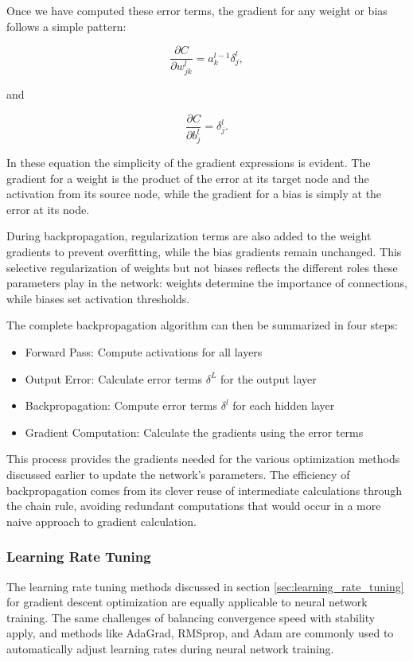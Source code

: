 Once we have computed these error terms, the gradient for any weight or bias follows a simple pattern:

\begin{equation}
    \frac{\partial C}{\partial w_{jk}^l} = a_k^{l-1}\delta_j^l,
\end{equation}

and

\begin{equation}
    \frac{\partial C}{\partial b_j^l} = \delta_j^l.
\end{equation}

In these equation the simplicity of the gradient expressions is evident. The gradient for a weight is the product of the error at its target node and the activation from its source node, while the gradient for a bias is simply at the error at its node.

During backpropagation, regularization terms are also added to the weight gradients to prevent overfitting, while the bias gradients remain unchanged. This selective regularization of weights but not biases reflects the different roles these parameters play in the network: weights determine the importance of connections, while biases set activation thresholds.

The complete backpropagation algorithm can then be summarized in four steps:

\begin{itemize}
    \item Forward Pass: Compute activations for all layers
    \item Output Error: Calculate error terms \( \delta^L \) for the output layer
    \item Backpropagation: Compute error terms \( \delta^l \) for each hidden layer
    \item Gradient Computation: Calculate the gradients using the error terms
\end{itemize}

This process provides the gradients needed for the various optimization methods discussed earlier to update the network's parameters. The efficiency of backpropagation comes from its clever reuse of intermediate calculations through the chain rule, avoiding redundant computations that would occur in a more naive approach to gradient calculation.

\subsubsection{Learning Rate Tuning}
The learning rate tuning methods discussed in section \ref{sec:learning_rate_tuning} for gradient descent optimization are equally applicable to neural network training. The same challenges of balancing convergence speed with stability apply, and methods like AdaGrad, RMSprop, and Adam are commonly used to automatically adjust learning rates during neural network training.

